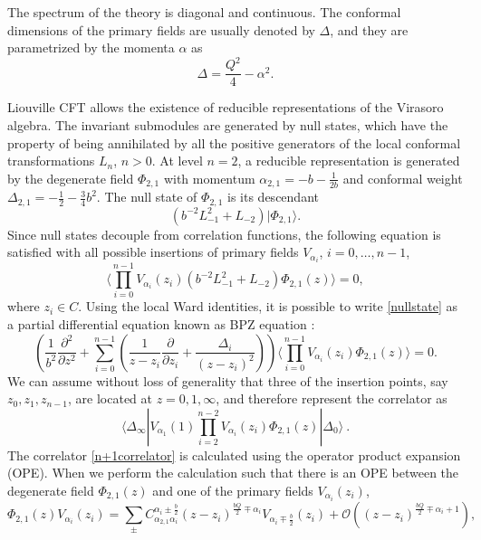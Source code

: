 \documentclass[11pt]{article}
\numberwithin{equation}{section}
\newcommand{\be}{\begin{equation}}
\newcommand{\ee}{\end{equation}}
\begin{document}
The spectrum of the theory is diagonal and continuous. The conformal dimensions of the primary fields are usually denoted by $\Delta$, and they are parametrized by the  momenta $\alpha$ as
\be\Delta=\frac{Q^2}{4}-\alpha^2.\ee

Liouville CFT allows the existence of reducible representations of the Virasoro algebra. 
The invariant submodules are generated by null states, which have the property of being annihilated by all the positive generators of the local conformal transformations $L_n$, $n>0$.
At level $n=2$, 
a reducible representation is generated by the degenerate field $\Phi_{2,1}$ with momentum $\alpha_{2,1}=-b-\frac{1}{2b}$ and conformal weight $\Delta_{2,1}=-\frac{1}{2}-\frac{3}{4}b^2$. The null state  of $\Phi_{2,1}$ is its descendant
\begin{equation}
\left(b^{-2}L_{-1}^2+L_{-2}\right)|\Phi_{2,1}\rangle.
\end{equation}
Since null states decouple from correlation functions, the following equation is satisfied
%
with all possible insertions of primary fields $V_{\alpha_i}$, $i=0,\dots,n-1$, 
\begin{equation}\label{nullstate}
\langle\prod_{i=0}^{n-1}V_{\alpha_i}(z_i)\left(b^{-2}L_{-1}^2+L_{-2}\right)\Phi_{2,1}(z)\rangle=0,
\end{equation}
where $z_i\in C$. Using the local Ward identities, it is possible to write \eqref{nullstate} as a 
%
%
partial differential equation known as BPZ equation \cite{bpz}:
\begin{equation}\label{partialBPZ}
\left(\frac {1}{b^{2}}\frac{\partial^{2}}{\partial z^{2}}+\sum _{i=0}^{n-1}\left(\frac{1}{z-z_{i}}\frac {\partial }{\partial z_{i}}+\frac {\Delta _{i}}{(z-z_{i})^{2}}\right)\right)\langle \prod _{i=0}^{n-1}V_{\alpha_{i}}(z_{i})\Phi_{2,1}(z)\rangle =0.
\end{equation}
We can assume without loss of generality that three of the insertion points, say $z_0, z_1, z_{n-1}$, are located at $z= 0,1, \infty$,  and therefore represent the correlator as
\be \label{n+1correlator} \langle\Delta_{\infty}|V_{\alpha_1}(1)\prod_{i=2}^{n-2}V_{\alpha_i}(z_i)\Phi_{2,1}(z)|\Delta_0\rangle~.\ee
%
The correlator \eqref{n+1correlator} is calculated using the operator product expansion (OPE). 
When we perform the calculation such that there is an OPE between the degenerate field $\Phi_{2,1}(z)$ and one of the primary fields $V_{\alpha_i}(z_i)$,
\begin{equation}\label{OPEzi}
\Phi_{2,1}(z)V_{\alpha_i}(z_i)=\sum_{\pm}C_{\alpha_{2,1}\alpha_i}^{\alpha_i\pm\frac{b}{2}}(z-z_i)^{\frac{bQ}{2}\mp\alpha_i}V_{\alpha_i\mp\frac{b}{2}}(z_i)+\mathcal{O}\left((z-z_i)^{\frac{bQ}{2}\mp\alpha_i+1}\right),
\end{equation}
\end{document}
